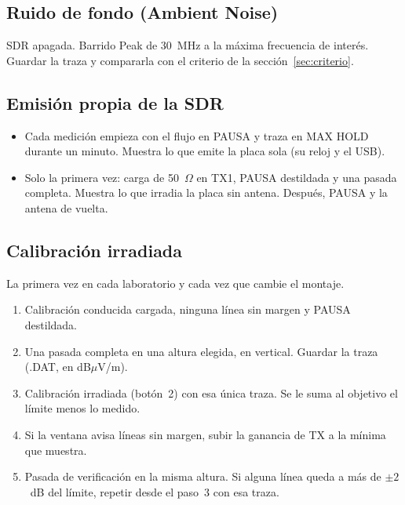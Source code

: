 \documentclass[11pt,a4paper]{article}
\begin{document}
\subsection{Ruido de fondo (Ambient Noise)}

SDR apagada. Barrido Peak de 30~MHz a la máxima frecuencia de interés. Guardar la traza y compararla con el criterio de la sección~\ref{sec:criterio}.

\subsection{Emisión propia de la SDR}

\begin{itemize}
  \item Cada medición empieza con el flujo en PAUSA y traza en MAX HOLD durante un minuto. Muestra lo que emite la placa sola (su reloj y el USB).
  \item Solo la primera vez: carga de 50~$\Omega$ en TX1, PAUSA destildada y una pasada completa. Muestra lo que irradia la placa sin antena. Después, PAUSA y la antena de vuelta.
\end{itemize}



\subsection{Calibración irradiada}\label{sec:cal_irradiada}

La primera vez en cada laboratorio y cada vez que cambie el montaje.

\begin{enumerate}
  \item Calibración conducida cargada, ninguna línea sin margen y PAUSA destildada.
  \item Una pasada completa en una altura elegida, en vertical. Guardar la traza (.DAT, en dB$\mu$V/m).
  \item Calibración irradiada (botón~2) con esa única traza. Se le suma al objetivo el límite menos lo medido.
  \item Si la ventana avisa líneas sin margen, subir la ganancia de TX a la mínima que muestra.
  \item Pasada de verificación en la misma altura. Si alguna línea queda a más de $\pm 2$~dB del límite, repetir desde el paso~3 con esa traza.
\end{enumerate}
\end{document}
